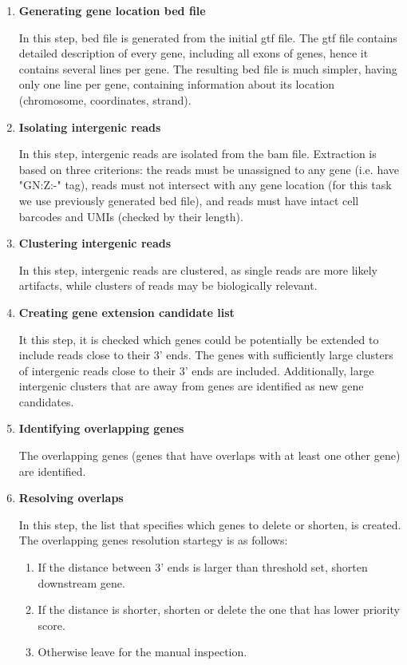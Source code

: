 \begin{enumerate}
  \item \textbf{Generating gene location bed file}
  
  In this step, bed file is generated from the initial gtf file.
  The gtf file contains detailed description of every gene, including all exons of genes, hence it contains several lines per gene.
  The resulting bed file is much simpler, having only one line per gene, containing information about its location (chromosome, coordinates, strand).

  \item \textbf{Isolating intergenic reads}
  
  In this step, intergenic reads are isolated from the bam file.
  Extraction is based on three criterions:
  the reads must be unassigned to any gene (i.e. have "GN:Z:-" tag),
  reads must not intersect with any gene location (for this task we use previously generated bed file),
  and reads must have intact cell barcodes and UMIs (checked by their length).
  
  \item \textbf{Clustering intergenic reads}
  
  In this step, intergenic reads are clustered, as single reads are more likely artifacts, while clusters of reads may be biologically relevant.
  
  
  \item \textbf{Creating gene extension candidate list}
  
  It this step, it is checked which genes could be potentially be extended to include reads close to their 3' ends.
  The genes with sufficiently large clusters of intergenic reads close to their 3' ends are included.
  Additionally, large intergenic clusters that are away from genes are identified as new gene candidates.
  
  \item \textbf{Identifying overlapping genes}
  
  The overlapping genes (genes that have overlaps with at least one other gene) are identified.
  
  \item \textbf{Resolving overlaps}
  
  In this step, the list that specifies which genes to delete or shorten, is created.
  The overlapping genes resolution startegy is as follows:
  
  \begin{enumerate}
    \item If the distance between 3' ends is larger than threshold set, shorten downstream gene.
    \item If the distance is shorter, shorten or delete the one that has lower priority score.
    \item Otherwise leave for the manual inspection.
  \end{enumerate}
  

\end{enumerate}
